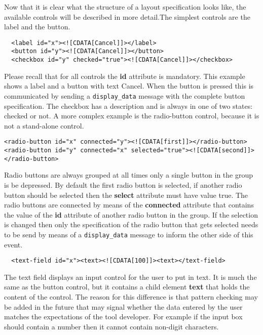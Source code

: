 \documentclass{article}
\newcommand{\msg}[1]{\texttt{#1}}
\begin{document}
   Now that it is clear what the structure of a layout specification looks
   like, the available controls will be described in more detail.The simplest
   controls are the label and the button.

    \begin{verbatim}
  <label id="x"><![CDATA[Cancel]]></label>
  <button id="y"><![CDATA[Cancel]]></button>
  <checkbox id="y" checked="true"><![CDATA[Cancel]]></checkbox>\end{verbatim}

   Please recall that for all controls the \textbf{id} attribute is mandatory.
   This example shows a label and a button with text Cancel. When the button is
   pressed this is communicated by sending a \msg{display\_data} message with the
   complete button specification. The checkbox has a description and is always
   in one of two states: checked or not. A more complex example is the
   radio-button control, because it is not a stand-alone control.

    \begin{verbatim}
<radio-button id="x" connected="y"><![CDATA[first]]></radio-button>
<radio-button id="y" connected="x" selected="true"><![CDATA[second]]></radio-button>\end{verbatim}

   Radio buttons are always grouped at all times only a single button in the
   group is be depressed.  By default the first radio button is selected, if
   another radio button should be selected then the \textbf{select} attribute
   must have value true. The radio buttons are connected by means of the
   \textbf{connected} attribute that contains the value of the \textbf{id}
   attribute of another radio button in the group. If the selection is changed
   then only the specification of the radio button that gets selected needs to
   be send by means of a \msg{display\_data} message to inform the other side
   of this event.

    \begin{verbatim}
  <text-field id="x"><text><![CDATA[100]]><text></text-field>\end{verbatim}

   The text field displays an input control for the user to put in text. It is
   much the same as the button control, but it contains a child element
   \textbf{text} that holds the content of the control. The reason for this
   difference is that pattern checking may be added in the future that may
   signal whether the data entered by the user matches the expectations of the
   tool developer. For example if the input box should contain a number then it
   cannot contain non-digit characters.
\end{document}
